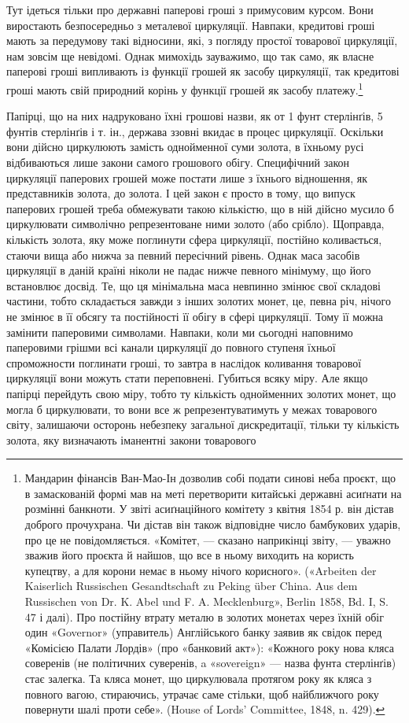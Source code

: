 Тут ідеться тільки про державні паперові гроші з примусовим
курсом. Вони виростають безпосередньо з металевої циркуляції.
Навпаки, кредитові гроші мають за передумову такі відносини,
які, з погляду простої товарової циркуляції, нам зовсім ще невідомі.
Однак мимохідь зауважимо, що так само, як власне паперові
гроші випливають із функції грошей як засобу циркуляції,
так кредитові гроші мають свій природний корінь у функції
грошей як засобу платежу.\footnote{
Мандарин фінансів Ван-Мао-Ін дозволив собі подати синові
неба проєкт, що в замаскованій формі мав на меті перетворити китайські
державні асиґнати на розмінні банкноти. У звіті асиґнаційного комітету
з квітня 1854 р. він дістав доброго прочухрана. Чи дістав він також відповідне
число бамбукових ударів, про це не повідомляється. «Комітет, —
сказано наприкінці звіту, — уважно зважив його проєкта й найшов, що
все в ньому виходить на користь купецтву, а для корони немає в ньому
нічого корисного». («Arbeiten der Kaiserlich Russischen Gesandtschaft zu
Peking über China. Aus dem Russischen von Dr. K. Abel und F. A. Mecklenburg»,
Berlin 1858, Bd. I, S. 47 і далі). Про постійну втрату металю в
золотих монетах через їхній обіг один «Governor» (управитель) Англійського
банку заявив як свідок перед «Комісією Палати Лордів» (про
«банковий акт»): «Кожного року нова кляса соверенів (не політичних
суверенів, a «sovereign» — назва фунта стерлінґів) стає залегка. Та кляса
монет, що циркулювала протягом року як кляса з повного вагою, стираючись,
утрачає саме стільки, щоб найближчого року повернути шалі
проти себе». (House of Lords’ Committee, 1848, n. 429).
}

Папірці, що на них надруковано їхні грошові назви, як от
1 фунт стерлінґів, 5 фунтів стерлінґів і т. ін., держава ззовні
вкидає в процес циркуляції. Оскільки вони дійсно циркулюють
замість однойменної суми золота, в їхньому русі відбиваються
лише закони самого грошового обігу. Специфічний закон циркуляції
паперових грошей може постати лише з їхнього відношення,
як представників золота, до золота. І цей закон є просто в тому,
що випуск паперових грошей треба обмежувати такою кількістю,
що в ній дійсно мусило б циркулювати символічно репрезентоване
ними золото (або срібло). Щоправда, кількість золота, яку може
поглинути сфера циркуляції, постійно коливається, стаючи вища
або нижча за певний пересічний рівень. Однак маса засобів циркуляції
в даній країні ніколи не падає нижче певного мінімуму,
що його встановлює досвід. Те, що ця мінімальна маса невпинно
змінює свої складові частини, тобто складається завжди з інших
золотих монет, це, певна річ, нічого не змінює в її обсягу та постійності
її обігу в сфері циркуляції. Тому її можна замінити паперовими
символами. Навпаки, коли ми сьогодні наповнимо паперовими
грішми всі канали циркуляції до повного ступеня їхньої
спроможности поглинати гроші, то завтра в наслідок коливання
товарової циркуляції вони можуть стати переповнені. Губиться
всяку міру. Але якщо папірці перейдуть свою міру, тобто ту
кількість однойменних золотих монет, що могла б циркулювати,
то вони все ж репрезентуватимуть у межах товарового світу,
залишаючи осторонь небезпеку загальної дискредитації, тільки
ту кількість золота, яку визначають іманентні закони товарового
\parbreak{}  %
